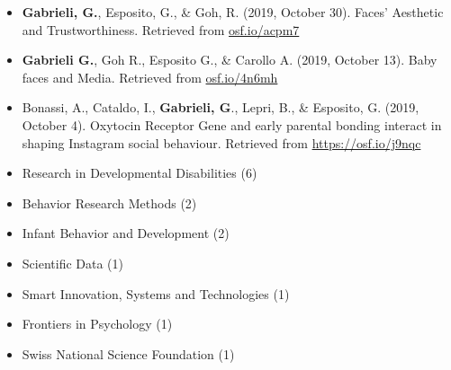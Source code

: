 \documentclass[10pt,a4paper]{altacv}
\begin{document}
\begin{fullwidth}
\begin{itemize}
			\item \textbf{Gabrieli, G.}, Esposito, G., \& Goh, R. (2019, October 30). Faces' Aesthetic and Trustworthiness. Retrieved from \href{https://osf.io/acpm7}{osf.io/acpm7}
			
			\item \textbf{Gabrieli G.}, Goh R., Esposito G., \& Carollo A. (2019, October 13). Baby faces and Media. Retrieved from \href{https://osf.io/4n6mh}{osf.io/4n6mh} 
			
			\item Bonassi, A., Cataldo, I., \textbf{Gabrieli, G}., Lepri, B., \& Esposito, G. (2019, October 4). Oxytocin Receptor Gene and early parental bonding interact in shaping Instagram social behaviour. Retrieved from \href{https://osf.io/j9nqc}{https://osf.io/j9nqc} 
			
		\end{itemize}
		
		\begin{itemize}
			\item Research in Developmental Disabilities (6)
			\item Behavior Research Methods (2)
			\item Infant Behavior and Development (2)
			\item Scientific Data (1)
			\item Smart Innovation, Systems and Technologies (1)
			\item Frontiers in Psychology (1)
			\item Swiss National Science Foundation (1)
		\end{itemize}
		
		\divider
		
		
		
		\divider
		
		
		\divider		
		
		
		\divider
		
		
		\divider
		
	\end{fullwidth}
	
\end{document}
